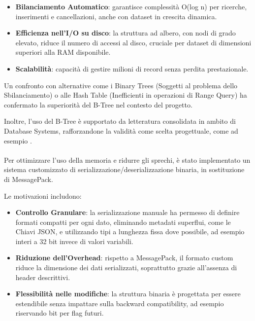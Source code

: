\documentclass[12pt,a4paper,openright,twoside]{book}
\begin{document}
        \begin{itemize}
            \item \textbf{Bilanciamento Automatico}: garantisce complessità O(log n) per ricerche, inserimenti e cancellazioni, anche con dataset in crescita dinamica.
            \item \textbf{Efficienza nell’I/O su disco}: la struttura ad albero, con nodi di grado elevato, riduce il numero di accessi al disco, cruciale per dataset di dimensioni superiori alla RAM disponibile.
            \item \textbf{Scalabilità}: capacità di gestire milioni di record senza perdita prestazionale.
        \end{itemize}

        Un confronto con alternative come i Binary Trees (Soggetti al problema dello Sbilanciamento) o alle Hash Table (Inefficienti in operazioni di Range Query) ha confermato la superiorità del B-Tree nel contesto del progetto.

        Inoltre, l’uso del B-Tree è supportato da letteratura consolidata in ambito di Database Systems, rafforzandone la validità come scelta progettuale, come ad esempio \cite{mostafa2020case}.

        \paragraph*{}

        Per ottimizzare l’uso della memoria e ridurre gli sprechi, è stato implementato un sistema customizzato di serializzazione/deserializzazione binaria, in sostituzione di MessagePack.

        Le motivazioni includono:
        \begin{itemize}
            \item \textbf{Controllo Granulare}: la serializzazione manuale ha permesso di definire formati compatti per ogni dato, eliminando metadati superflui, come le Chiavi JSON, e utilizzando tipi a lunghezza fissa dove possibile, ad esempio interi a 32 bit invece di valori variabili.
            \item \textbf{Riduzione dell’Overhead}: rispetto a MessagePack, il formato custom riduce la dimensione dei dati serializzati, soprattutto grazie all’assenza di header descrittivi.
            \item \textbf{Flessibilità nelle modifiche}: la struttura binaria è progettata per essere estendibile senza impattare sulla backward compatibility, ad esempio riservando bit per flag futuri.
        \end{itemize}
\end{document}
